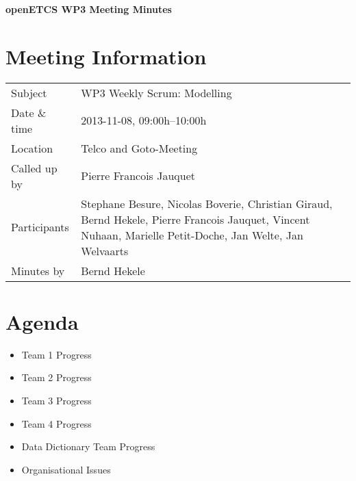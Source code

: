 \documentclass[a4paper, 11pt]{article}
\begin{document}
{\begin{center}\huge\bf openETCS WP3 Meeting Minutes\end{center}}
\section{Meeting Information}

\renewcommand{\arraystretch}{1.5}
\begin{supertabular}{m{.2\textwidth}m{.8\textwidth}}
Subject & WP3 Weekly Scrum: Modelling\\
Date \& time & 2013-11-08, 09:00h--10:00h\\
Location & Telco and Goto-Meeting\\
Called up by & Pierre Francois Jauquet\\
Participants &
Stephane Besure,
Nicolas Boverie,
Christian Giraud,
Bernd Hekele,
Pierre Francois Jauquet,
Vincent Nuhaan,
Marielle Petit-Doche,
Jan Welte,
Jan Welvaarts
\\

Minutes by & Bernd Hekele\\
\end{supertabular}
\renewcommand{\arraystretch}{1.0}


\section{{Agenda}}
\begin{itemize}
\item Team 1 Progress
\item Team 2 Progress
\item Team 3 Progress
\item Team 4 Progress
\item Data Dictionary Team Progress
\item Organisational Issues 
\end{itemize}
\end{document}
